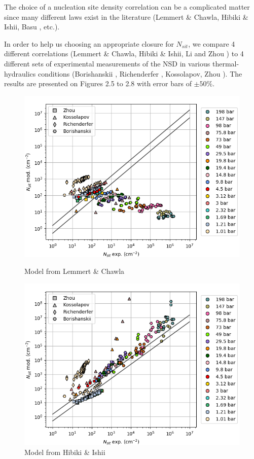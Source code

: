 The choice of a nucleation site density correlation can be a complicated matter since many different laws exist in the literature (Lemmert \& Chawla, Hibiki \& Ishii, Basu \etal, etc.).

\npar

In order to help us choosing an appropriate closure for $N_{sit}$, we compare 4 different correlations (Lemmert \& Chawla, Hibiki \& Ishii, Li \etal and Zhou \etal) to 4 different sets of experimental measurements of the NSD in various thermal-hydraulics conditions (Borishanskii \etal, Richenderfer \etal, Kossolapov, Zhou \etal). The results are presented on Figures 2.5 to 2.8 with error bars of $\pm 50 \%$.


\begin{figure}[h!]
\begin{multicols}{2}
\includegraphics[width=1.0\linewidth]{img/NSD/LC.png}
\caption{Model from Lemmert \& Chawla}

\includegraphics[width=1.0\linewidth]{img/NSD/HI_rtheta.png}
\caption{Model from Hibiki \& Ishii}
\end{multicols}
\end{figure}

